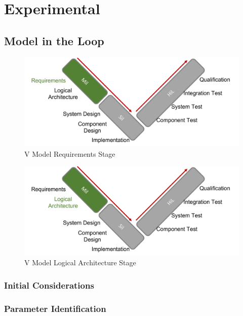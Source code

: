 \chapter{Experimental}
\label{experimental}
\section{Model in the Loop}
\begin{figure}[h!]
    \begin{center}
    \includegraphics[width=12cm]{Pictures/V Model Requirements.png}
    \caption[V Model Requirements]{V Model Requirements Stage}
    \label{V Model Requirements}
    \end{center}
\end{figure}

\begin{figure}[h!]
    \begin{center}
    \includegraphics[width=12cm]{Pictures/V Model Logical Architecture.png}
    \caption[V Model Logical Architecture]{V Model Logical Architecture Stage}
    \label{V Model Logical Architecture}
    \end{center}
\end{figure}

\subsection{Initial Considerations}
\subsection{Parameter Identification}
